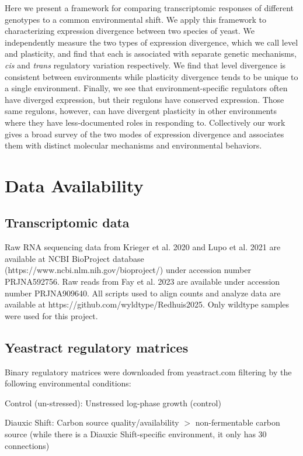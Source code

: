 Here we present a framework for comparing transcriptomic responses of different genotypes to a common environmental shift. We apply this framework to characterizing expression divergence between two species of yeast. We independently measure the two types of expression divergence, which we call level and plasticity, and find that each is associated with separate genetic mechanisms, \textit{cis} and \textit{trans} regulatory variation respectively. We find that level divergence is consistent between environments while plasticity divergence tends to be unique to a single environment. Finally, we see that environment-specific regulators often have diverged expression, but their regulons have conserved expression. Those same regulons, however, can have divergent plasticity in other environments where they have less-documented roles in responding to. Collectively our work gives a broad survey of the two modes of expression divergence and associates them with distinct molecular mechanisms and environmental behaviors.

\section{Data Availability}

\subsection{Transcriptomic data}
Raw RNA sequencing data from Krieger et al. 2020 and Lupo et al. 2021 are available at NCBI BioProject database (https://www.ncbi.nlm.nih.gov/bioproject/) under accession number PRJNA592756. Raw reads from Fay et al. 2023 are available under accession number PRJNA909640. All scripts used to align counts and analyze data are available at https://github.com/wyldtype/Redhuis2025. Only wildtype samples were used for this project.

\subsection{Yeastract regulatory matrices}
Binary regulatory matrices were downloaded from yeastract.com filtering by the following environmental conditions:

Control (un-stressed): Unstressed log-phase growth (control)

Diauxic Shift: Carbon source quality/availability $>$ non-fermentable carbon source (while there is a Diauxic Shift-specific environment, it only has 30 connections)

